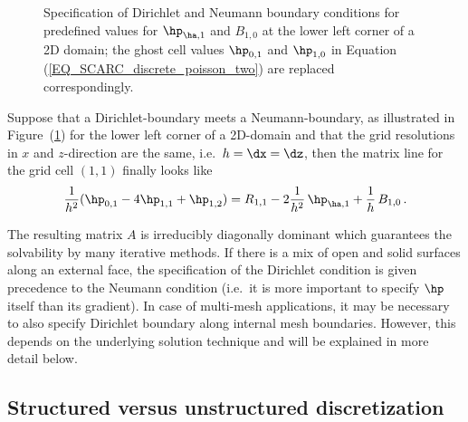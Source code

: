 \begin{figure}[ht]
\caption{Specification of Dirichlet and Neumann boundary conditions for predefined values for $\hp_{\ha,1}$ and $B_{1,0}$ at the lower left corner of a 2D domain; the ghost cell values $\hp_{0,1}$ and $\hp_{1,0}$ in Equation (\ref{EQ_SCARC_discrete_poisson_two}) are replaced correspondingly.}
\label{FIG_SCARC_bc_setting}
\end{figure}

Suppose that a Dirichlet-boundary meets a Neumann-boundary, as illustrated in Figure~(\ref{FIG_SCARC_bc_setting}) for the lower left corner of a 2D-domain and 
that the grid resolutions in $x$ and $z$-direction are the same, i.e.\ $h=\dx=\dz$, then the matrix line for the grid cell $(1,1)$ finally looks like
\begin{equation*}
\frac{1}{h^2} (\hp_{0,1} - 4\hp_{1,1} + \hp_{1,2} ) = R_{1,1} - 2\frac{1}{h^2} \, \hp_{\ha,1} + \frac{1}{h} \, B_{1,0} \,.
\end{equation*}

The resulting matrix $A$ is irreducibly diagonally dominant which guarantees the solvability by many iterative 
methods.
%
If there is a mix of open and solid surfaces along an external face, the specification of the Dirichlet condition is given precedence to the Neumann condition (i.e.\ it is more important to specify $\hp$ itself than its gradient).
%
In case of multi-mesh applications, it may be necessary to also specify Dirichlet boundary along internal mesh boundaries. However, this depends on the underlying solution technique and will be explained in more detail below.

\subsection{Structured versus unstructured discretization}
\label{SEC_SCARC_discretization_types}

